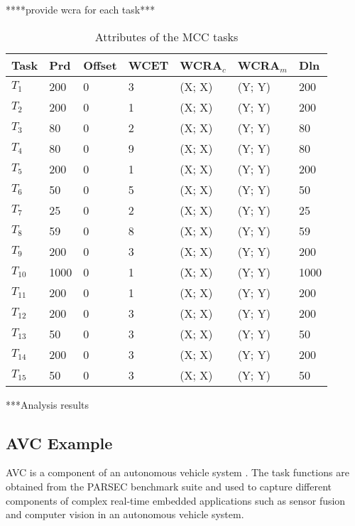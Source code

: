 ****provide wcra for each task***
\begin{table}
\centering
\caption{Attributes of the MCC tasks}
\label{tab:taskset1}
\vspace{1mm}
\begin{tabular}{|l|l|l|l|l|l|l|}
\hline
Task & Prd & Offset & WCET & WCRA$_c$ & WCRA$_m$ & Dln  \\
\hline  \hline
$T_1$ & 200 & 0 & 3 & (X; X) & (Y; Y) & 200 \\
\hline 
$T_2$ & 200 & 0 & 1 & (X; X) & (Y; Y) & 200 \\
\hline 
$T_3$ & 80 & 0 & 2 &(X; X) & (Y; Y) & 80 \\
\hline 
$T_4$ & 80 & 0 & 9 &(X; X) & (Y; Y) & 80 \\
\hline
$T_5$ & 200 & 0 & 1 &(X; X) & (Y; Y) & 200 \\
\hline
$T_6$ & 50 & 0 & 5 & (X; X) & (Y; Y) & 50 \\
\hline 
$T_7$ & 25 & 0 & 2 & (X; X) & (Y; Y) & 25 \\
\hline 
$T_8$ & 59 & 0 & 8 &(X; X) & (Y; Y) & 59 \\
\hline 
$T_9$ & 200 & 0 & 3 &(X; X) & (Y; Y) & 200 \\
\hline
$T_{10}$ & 1000 & 0 & 1 &(X; X) & (Y; Y) & 1000 \\
\hline
$T_{11}$ & 200 & 0 & 1 &(X; X) & (Y; Y) & 200 \\
\hline
$T_{12}$ & 200 & 0 & 3 &(X; X) & (Y; Y) & 200 \\
\hline
$T_{13}$ & 50 & 0 & 3 & (X; X) & (Y; Y) & 50 \\
\hline 
$T_{14}$ & 200 & 0 & 3 & (X; X) & (Y; Y) & 200 \\
\hline 
$T_{15}$ & 50 & 0 & 3 &(X; X) & (Y; Y) & 50 \\
\hline
\end{tabular}
\vspace{-2mm}
\end{table}

***Analysis results

\subsection{AVC Example}
AVC is a component of an autonomous vehicle system \cite{HyoseungData14}. The task functions are obtained from the PARSEC benchmark suite \cite{Bienia2008} and used to capture different components of complex real-time embedded applications such as sensor fusion and computer vision in an autonomous vehicle system.



